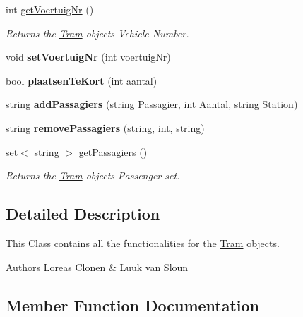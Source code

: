 \begin{DoxyCompactItemize}
int \hyperlink{classTram_abce34b0915945a2d7ede17297a727301}{get\+Voertuig\+Nr} ()
\begin{DoxyCompactList}\small\item\em Returns the \hyperlink{classTram}{Tram} object\textquotesingle{}s Vehicle Number. \end{DoxyCompactList}\item 
void {\bfseries set\+Voertuig\+Nr} (int voertuig\+Nr)\hypertarget{classTram_a4912c2cd70ee32329220618068c28692}{}\label{classTram_a4912c2cd70ee32329220618068c28692}

\item 
bool {\bfseries plaatsen\+Te\+Kort} (int aantal)\hypertarget{classTram_acbd3c261e6b3830741de4e37643cc9cf}{}\label{classTram_acbd3c261e6b3830741de4e37643cc9cf}

\item 
string {\bfseries add\+Passagiers} (string \hyperlink{classPassagier}{Passagier}, int Aantal, string \hyperlink{classStation}{Station})\hypertarget{classTram_a27f0c6832da5869a5173cc440fec9719}{}\label{classTram_a27f0c6832da5869a5173cc440fec9719}

\item 
string {\bfseries remove\+Passagiers} (string, int, string)\hypertarget{classTram_aefa8209a2667b653b56b0c48c801ed20}{}\label{classTram_aefa8209a2667b653b56b0c48c801ed20}

\item 
set$<$ string $>$ \hyperlink{classTram_a8efd626a399a6d5906043abdd915fd59}{get\+Passagiers} ()
\begin{DoxyCompactList}\small\item\em Returns the \hyperlink{classTram}{Tram} object\textquotesingle{}s Passenger set. \end{DoxyCompactList}\end{DoxyCompactItemize}


\subsection{Detailed Description}
This Class contains all the functionalities for the \hyperlink{classTram}{Tram} objects. 

\begin{DoxyAuthor}{Authors}
Loreas Clonen \& Luuk van Sloun 
\end{DoxyAuthor}


\subsection{Member Function Documentation}
